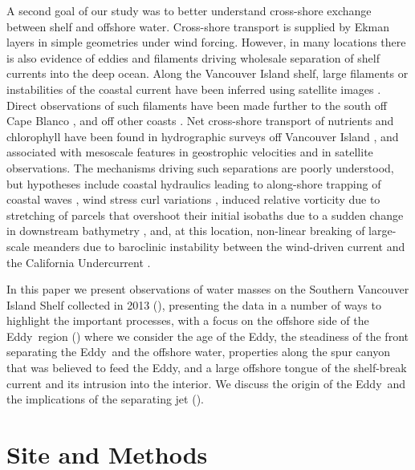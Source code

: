 \documentclass[draft]{agujournal2019}
\newcommand*{\Eddy}{{\sc Eddy}}
\begin{document}
A second goal of our study was to better understand cross-shore exchange between shelf and offshore water.  Cross-shore transport is supplied by Ekman layers in simple geometries under wind forcing. However, in many locations there is also evidence of eddies and filaments driving wholesale separation of shelf currents into the deep ocean.  Along the Vancouver Island shelf, large filaments or instabilities of the coastal current have been inferred using satellite images \cite{ikedaemery84,thomsongower98}.  Direct observations of such filaments have been made further to the south off Cape Blanco \cite{barthetal00}, and off other coasts \cite{relvasbarton05}. Net cross-shore transport of nutrients and chlorophyll have been found in hydrographic surveys off Vancouver Island \cite{mackasyelland99}, and associated with mesoscale features in geostrophic velocities and in satellite observations.  The mechanisms driving such separations are poorly understood, but hypotheses include coastal hydraulics leading to along-shore trapping of coastal waves \cite{dalebarth01},  wind stress curl variations \cite{castelaobarth07}, induced relative vorticity due to stretching of parcels that overshoot their initial isobaths due to a sudden change in downstream bathymetry \citep{dasaro88}, and, at this location, non-linear breaking of large-scale meanders due to baroclinic instability between the wind-driven current and the California Undercurrent \cite{ikedaetal84, batteen97}.

In this paper we present observations of water masses on the Southern Vancouver Island Shelf collected in 2013 (), presenting the data in a number of ways to highlight the important processes, with a focus on the offshore side of the \Eddy\ region () where we consider the age of the \Eddy, the steadiness of the front separating the \Eddy\ and the offshore water, properties along the spur canyon that was believed to feed the \Eddy, and a large offshore tongue of the shelf-break current and its intrusion into the interior.  We discuss the origin of the \Eddy\ and the implications of the separating jet ().

\section{Site and Methods}
\label{sec:Site}
\end{document}
